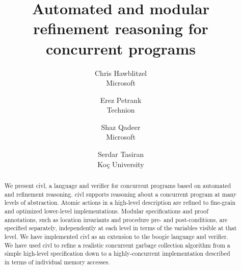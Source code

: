 \documentclass[twocolumn]{article}
\theoremstyle{remark}
\theoremstyle{definition}
\newcommand{\civl}{{\sc civl}\xspace}
\newcommand{\boogie}{{\sc boogie}\xspace}
\begin{document}
\title{Automated and modular refinement reasoning for concurrent programs}
\author{Chris Hawblitzel \\ Microsoft \and Erez Petrank \\ Technion \and Shaz Qadeer \\ Microsoft \and Serdar Tasiran \\ Ko\c{c} University}

\maketitle



\begin{abstract}
We present \civl, a language and verifier for concurrent programs based on automated and refinement reasoning.  
\civl supports reasoning about a concurrent program at many levels of abstraction. 
Atomic actions in a high-level description are refined to fine-grain and optimized lower-level implementations. 
Modular specifications and proof annotations, such as location invariants and procedure pre- and post-conditions, 
are specified separately, independently at each level in terms of the variables visible at that level. 
We have implemented \civl as an extension to the \boogie language and verifier.
We have used \civl to refine a realistic concurrent garbage collection algorithm
from a simple high-level specification down to a highly-concurrent implementation described in terms of individual memory accesses.
\end{abstract}












\end{document}
